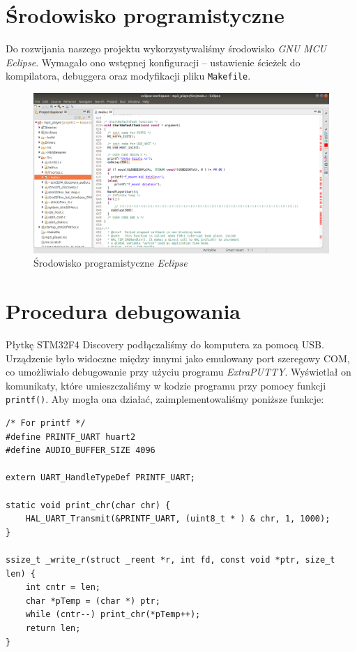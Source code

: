 \documentclass[12pt,a4paper]{article}
\begin{document}
\section{Środowisko programistyczne}
Do rozwijania naszego projektu wykorzystywaliśmy środowisko \emph{GNU MCU Eclipse}. Wymagało ono wstępnej konfiguracji -- ustawienie ścieżek do kompilatora, debuggera oraz modyfikacji pliku \texttt{Makefile}.

\begin{figure}[H]
 \centerline{\includegraphics[width=\textwidth]{img/img6}}
 \caption{Środowisko programistyczne \emph{Eclipse}}
 \label{img6}
\end{figure}

\section{Procedura debugowania}
Płytkę STM32F4 Discovery podłączaliśmy do komputera za pomocą USB. Urządzenie było widoczne między innymi jako emulowany port szeregowy COM, co umożliwiało debugowanie przy użyciu programu \emph{ExtraPUTTY}. Wyświetlał on komunikaty, które umieszczaliśmy w kodzie programu przy pomocy funkcji \texttt{printf()}. Aby mogła ona działać, zaimplementowaliśmy poniższe funkcje:

\begin{lstlisting}
/* For printf */
#define PRINTF_UART huart2
#define AUDIO_BUFFER_SIZE 4096

extern UART_HandleTypeDef PRINTF_UART;

static void print_chr(char chr) {
    HAL_UART_Transmit(&PRINTF_UART, (uint8_t * ) & chr, 1, 1000);
}

ssize_t _write_r(struct _reent *r, int fd, const void *ptr, size_t len) {
    int cntr = len;
    char *pTemp = (char *) ptr;
    while (cntr--) print_chr(*pTemp++);
    return len;
}
\end{lstlisting}
\end{document}
